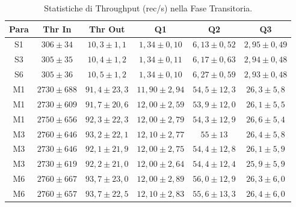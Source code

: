 \documentclass[conference]{IEEEtran}
\begin{document}




\begin{table}[htbp]
\centering
\caption{Statistiche di Throughput (rec/s) nella Fase Transitoria.}
\label{tab:transient_stats}
\footnotesize
\setlength{\tabcolsep}{4pt}
\begin{tabular}{cccccc}
\hline
\textbf{Para} & \textbf{Thr In} & \textbf{Thr Out} & \textbf{Q1} & \textbf{Q2} & \textbf{Q3} \\
\hline
S1 & $306 \pm 34$ & $10,3 \pm 1,1$ & $1,34 \pm 0,10$ & $6,13 \pm 0,52$ & $2,95 \pm 0,49$ \\
S3 & $305 \pm 35$ & $10,4 \pm 1,2$ & $1,34 \pm 0,11$ & $6,17 \pm 0,63$ & $2,94 \pm 0,48$ \\
S6 & $305 \pm 36$ & $10,5 \pm 1,2$ & $1,34 \pm 0,10$ & $6,27 \pm 0,59$ & $2,93 \pm 0,48$ \\
\hline
M1 & $2730 \pm 688$ & $91,4 \pm 23,3$ & $11,90 \pm 2,94$ & $54,5 \pm 12,3$ & $26,3 \pm 5,8$ \\
M1 & $2730 \pm 609$ & $91,7 \pm 20,6$ & $12,00 \pm 2,59$ & $53,9 \pm 12,0$ & $26,1 \pm 5,5$ \\
M1 & $2750 \pm 656$ & $92,3 \pm 22,3$ & $12,00 \pm 2,79$ & $54,3 \pm 12,9$ & $26,6 \pm 5,4$ \\
M3 & $2760 \pm 646$ & $93,2 \pm 22,1$ & $12,10 \pm 2,77$ & $55 \pm 13$ & $26,4 \pm 5,8$ \\
M3 & $2730 \pm 646$ & $92,1 \pm 21,9$ & $12,00 \pm 2,75$ & $54,4 \pm 12,8$ & $26,1 \pm 5,9$ \\
M3 & $2730 \pm 619$ & $92,2 \pm 21,0$ & $12,00 \pm 2,64$ & $54,4 \pm 12,4$ & $25,9 \pm 5,9$ \\
M6 & $2760 \pm 667$ & $93,7 \pm 23,0$ & $12,00 \pm 2,89$ & $56,0 \pm 12,9$ & $26,3 \pm 6,0$ \\
M6 & $2760 \pm 657$ & $93,7 \pm 22,5$ & $12,10 \pm 2,83$ & $55,6 \pm 13,3$ & $26,4 \pm 6,0$ \\

\end{tabular}
\end{table}
\end{document}
